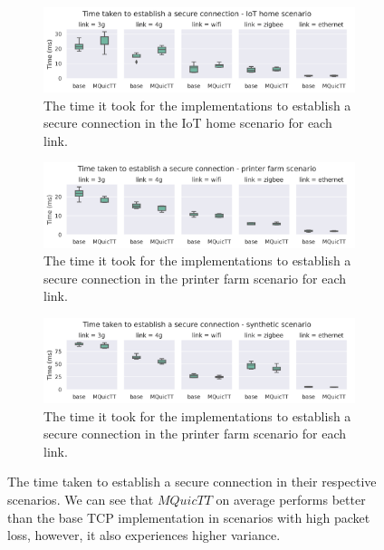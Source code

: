 \begin{figure}
    \begin{center}
        \begin{subfigure}[b]{1\textwidth}
            \includegraphics[width=1\linewidth]{images/analysis_connection_time_home.png}
            \caption{The time it took for the implementations to establish a secure connection in the IoT home scenario for each link.}
            \label{fig:connect_time_home}
        \end{subfigure}
        \vspace{1.5em}

        \begin{subfigure}[b]{1\textwidth}
            \includegraphics[width=1\linewidth]{images/analysis_connection_time_farm.png}
            \caption{The time it took for the implementations to establish a secure connection in the printer farm scenario for each link.}
            \label{fig:connect_time_farm}
        \end{subfigure}
        \vspace{1.5em}

        \begin{subfigure}[b]{1\textwidth}
            \includegraphics[width=1\linewidth]{images/analysis_connection_time_synth.png}
            \caption{The time it took for the implementations to establish a secure connection in the printer farm scenario for each link.}
            \label{fig:connect_time_synth}
        \end{subfigure}

        \caption{The time taken to establish a secure connection in their respective scenarios.
            We can see that $MQuicTT$ on average performs better than the base TCP implementation in scenarios with high packet loss, however, it also experiences higher variance.}
        \label{fig:connection_time}
    \end{center}
\end{figure}

